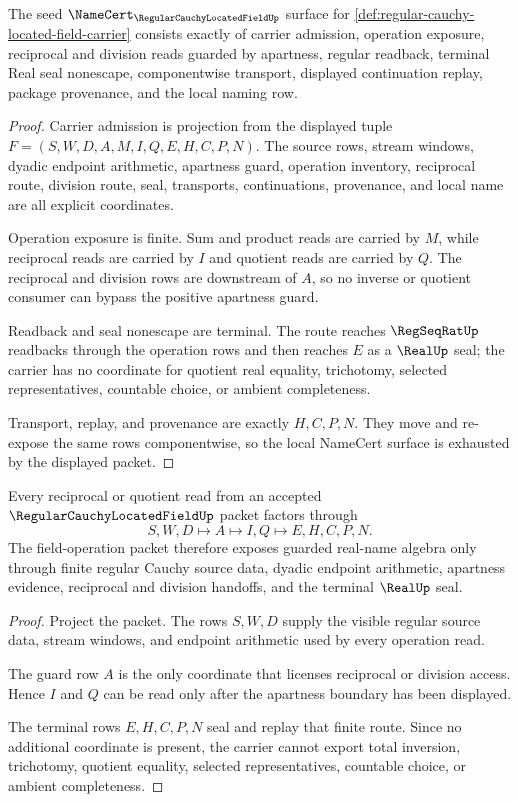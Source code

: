 \begin{theorem}
\label{thm:regular-cauchy-located-field-namecert-obligations}
The seed $\NameCert_{\RegularCauchyLocatedFieldUp}$ surface for \autoref{def:regular-cauchy-located-field-carrier} consists exactly of carrier admission, operation exposure, reciprocal and division reads guarded by apartness, regular readback, terminal Real seal nonescape, componentwise transport, displayed continuation replay, package provenance, and the local naming row.
\end{theorem}
\begin{proof}
Carrier admission is projection from the displayed tuple $F=(S,W,D,A,M,I,Q,E,H,C,P,N)$. The source rows, stream windows, dyadic endpoint arithmetic, apartness guard, operation inventory, reciprocal route, division route, seal, transports, continuations, provenance, and local name are all explicit coordinates.

Operation exposure is finite. Sum and product reads are carried by $M$, while reciprocal reads are carried by $I$ and quotient reads are carried by $Q$. The reciprocal and division rows are downstream of $A$, so no inverse or quotient consumer can bypass the positive apartness guard.

Readback and seal nonescape are terminal. The route reaches $\RegSeqRatUp$ readbacks through the operation rows and then reaches $E$ as a $\RealUp$ seal; the carrier has no coordinate for quotient real equality, trichotomy, selected representatives, countable choice, or ambient completeness.

Transport, replay, and provenance are exactly $H,C,P,N$. They move and re-expose the same rows componentwise, so the local NameCert surface is exhausted by the displayed packet.
\end{proof}

\begin{theorem}
\label{thm:regular-cauchy-located-field-guarded-division-scope}
Every reciprocal or quotient read from an accepted $\RegularCauchyLocatedFieldUp$ packet factors through
$$
S,W,D \longmapsto A \longmapsto I,Q \longmapsto E,H,C,P,N.
$$
The field-operation packet therefore exposes guarded real-name algebra only through finite regular Cauchy source data, dyadic endpoint arithmetic, apartness evidence, reciprocal and division handoffs, and the terminal $\RealUp$ seal.
\end{theorem}
\begin{proof}
Project the packet. The rows $S,W,D$ supply the visible regular source data, stream windows, and endpoint arithmetic used by every operation read.

The guard row $A$ is the only coordinate that licenses reciprocal or division access. Hence $I$ and $Q$ can be read only after the apartness boundary has been displayed.

The terminal rows $E,H,C,P,N$ seal and replay that finite route. Since no additional coordinate is present, the carrier cannot export total inversion, trichotomy, quotient equality, selected representatives, countable choice, or ambient completeness.
\end{proof}

